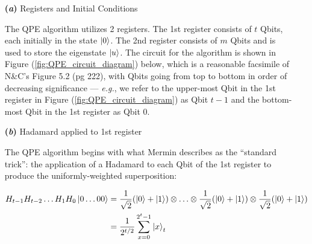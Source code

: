 \documentclass{article}
\begin{document}
\begin{enumerate}[label=\textbf{(\arabic*)}]
\begin{itemize}
  \item[\textbf{(\textit{a})}] Registers and Initial Conditions
  
  \vspace{0.05in}
  
  The QPE algorithm utilizes 2 registers. The 1st register consists of $t$ Qbits, each initially in the state $\ket{0}$. The 2nd register consists of $m$ Qbits and is used to store the eigenstate $\ket{u}$. The circuit for the algorithm is shown in Figure (\ref{fig:QPE_circuit_diagram}) below, which is a reasonable facsimile of N\&C's Figure 5.2 (pg 222), with Qbits going from top to bottom in order of decreasing significance --- \textit{e.g.}, we refer to the upper-most Qbit in the 1st register in Figure (\ref{fig:QPE_circuit_diagram}) as Qbit $t-1$ and the bottom-most Qbit in the 1st register as Qbit $0$.
  
  \vspace{0.05in}
  
  \item[\textbf{(\textit{b})}] Hadamard applied to 1st register
  
  \vspace{0.05in}
  
  The QPE algorithm begins with what Mermin describes as the ``standard trick'': the application of a Hadamard to each Qbit of the 1st register to produce the uniformly-weighted superposition:
  
  \begin{align}
      H_{t-1}H_{t-2}\ldots H_{1}H_{0}\ket{0\ldots 00}
      &=
      \frac{1}{\sqrt{2}}(\ket{0} + \ket{1})
      \otimes
      \ldots
      \otimes
      \frac{1}{\sqrt{2}}(\ket{0} + \ket{1})
      \otimes
      \frac{1}{\sqrt{2}}(\ket{0} + \ket{1})\\
      &=
      \frac{1}{2^{t/2}}\sum_{x=0}^{2^t-1}\ket{x}_{t}
  \end{align}
  
\vspace{0.25in}



\end{itemize}
\end{enumerate}
\end{document}
